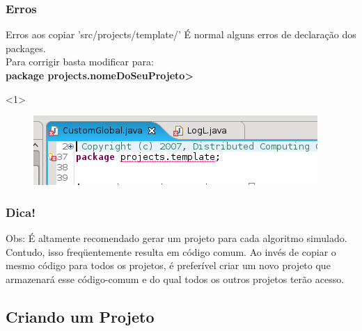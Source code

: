 \documentclass{beamer}
\begin{document}
\begin{frame}
	\frametitle{Erros}
	
	\begin{exampleblock}{Erros aos copiar 'src/projects/template/'}
		É normal alguns erros de declaração dos packages.\\
		Para corrigir basta modificar para: \\
		\textbf{package projects.nomeDoSeuProjeto>}
	\end{exampleblock}
	
	\begin{exampleblock}{}<1>
		\begin{figure}[t]
			\includegraphics[width=1\linewidth]{img/exemplo-erro}
		\end{figure}
	\end{exampleblock}

	
	
	
\end{frame}

\begin{frame}
	\frametitle{Dica!}
	
	\begin{alertblock}{}
	Obs: É altamente recomendado gerar um projeto para cada 
algoritmo simulado. Contudo, isso freqüentemente resulta em 
código comum. Ao invés de copiar o mesmo código para todos 
os projetos, é preferível criar um novo projeto que armazenará 
esse código-comum e do qual todos os outros projetos terão 
acesso.
	\end{alertblock}	
	
	
\end{frame}

\subsection{Criando um Projeto} %
\end{document}

